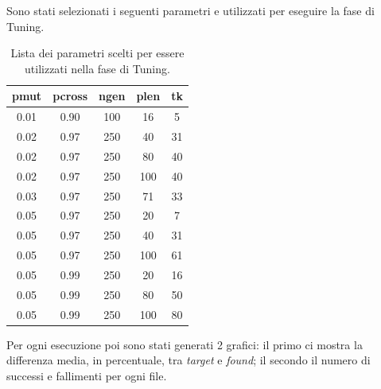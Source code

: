 Sono stati selezionati i seguenti parametri e utilizzati per eseguire la fase di
Tuning.

\begin{table}[H]
    \centering
    \begin{tabular}{||c||c||c||c||c||}
        \textbf{pmut} & \textbf{pcross} & \textbf{ngen} & \textbf{plen} & \textbf{tk} \\
        \hline
        0.01          & 0.90            & 100           & 16            & 5           \\
        0.02          & 0.97            & 250           & 40            & 31          \\
        0.02          & 0.97            & 250           & 80            & 40          \\
        0.02          & 0.97            & 250           & 100           & 40          \\
        0.03          & 0.97            & 250           & 71            & 33          \\
        0.05          & 0.97            & 250           & 20            & 7           \\
        0.05          & 0.97            & 250           & 40            & 31          \\
        0.05          & 0.97            & 250           & 100           & 61          \\
        0.05          & 0.99            & 250           & 20            & 16          \\
        0.05          & 0.99            & 250           & 80            & 50          \\
        0.05          & 0.99            & 250           & 100           & 80
    \end{tabular}
    \caption{Lista dei parametri scelti per essere utilizzati nella fase di Tuning.}
\end{table}

Per ogni esecuzione poi sono stati generati 2 grafici: il primo ci mostra la
differenza media, in percentuale, tra \textit{target} e \textit{found}; il
secondo il numero di successi e fallimenti per ogni file.

